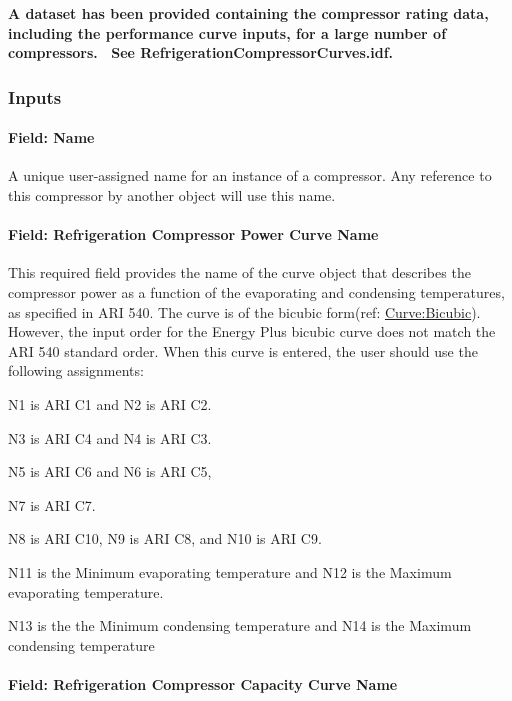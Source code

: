 \textbf{A dataset has been provided containing the compressor rating data, including the performance curve inputs, for a large number of compressors.~ See RefrigerationCompressorCurves.idf.}

\subsubsection{Inputs}\label{inputs-5-023}

\paragraph{Field: Name}\label{field-name-6-017}

A unique user-assigned name for an instance of a compressor. Any reference to this compressor by another object will use this name.

\paragraph{Field: Refrigeration Compressor Power Curve Name}\label{field-refrigeration-compressor-power-curve-name}

This required field provides the name of the curve object that describes the compressor power as a function of the evaporating and condensing temperatures, as specified in ARI 540. The curve is of the bicubic form(ref: \hyperref[curvebicubic]{Curve:Bicubic}).~ However, the input order for the Energy Plus bicubic curve does not match the ARI 540 standard order. When this curve is entered, the user should use the following assignments:

N1 is ARI C1 and N2 is ARI C2.

N3 is ARI C4 and N4 is ARI C3.

N5 is ARI C6 and N6 is ARI C5,

N7 is ARI C7.

N8 is ARI C10, N9 is ARI C8, and N10 is ARI C9.

N11 is the Minimum evaporating temperature and N12 is the Maximum evaporating temperature.

N13 is the the Minimum condensing temperature and N14 is the Maximum condensing temperature

\paragraph{Field: Refrigeration Compressor Capacity Curve Name}\label{field-refrigeration-compressor-capacity-curve-name}

